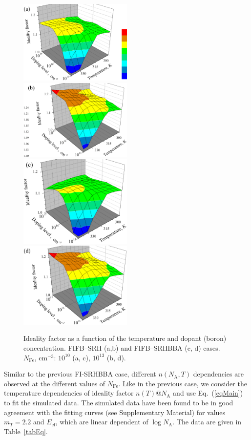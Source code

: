 \documentclass [sort&compress] {elsarticle}
\begin{document}
\begin{figure}
\includegraphics[width=0.5\textwidth]{Fig8a}%
\includegraphics[width=0.5\textwidth]{Fig8b}
\includegraphics[width=0.5\textwidth]{Fig8c}
\includegraphics[width=0.5\textwidth]{Fig8d}
\caption{\label{fig8}
Ideality factor as a function of the temperature and dopant (boron) concentration.
FIFB--SRH (a,b) and FIFB--SRHBBA (c, d) cases.
$N_\mathrm{Fe}$, cm$^{-3}$: $10^{10}$ (a, c), $10^{13}$ (b, d).
}%
\end{figure}

Similar to the previous FI-SRHBBA case, different $n(N_\mathrm{A}, T)$ dependencies are observed at the different values of $N_\mathrm{Fe}$.
Like in the previous case, we consider  the temperature dependencies of ideality factor $n(T)@ N_\mathrm{A}$
and use Eq.~(\ref{eqMain}) to fit the simulated data.
The simulated data have been found to be in good agreement with the fitting curves (see Supplementary Material) for values
$m_T=2.2$ and $E_\mathrm{ef}$,
which are linear dependent of $\log N_\mathrm{A}$.
The data are given in Table~\ref{tabEq}.
\end{document}

